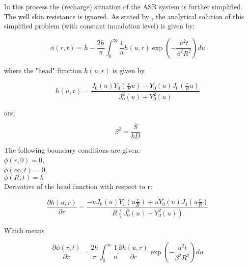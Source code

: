 In this process the (recharge) situation of the ASR system is further simplified. The well skin resistance is ignored. As stated by \citet{Bruggeman1999}, the analytical solution of this simplified problem (with constant inundation level) is given by: 

\begin{equation}
\phi (r, t) = h - \frac{2h}{\pi} \int_{0}^{\infty} \frac{1}{u} h(u, r) \exp ( -\frac{u^2 t}{\beta^2 R^2}) du
\label{eq:brug_22302}
\end{equation}

where the "head" function $h(u, r)$ is given by

\begin{equation}
h (u, r) = \frac{J_0(u) Y_0 (\frac{r}{R}u) - Y_0 (u) J_0 (\frac{r}{R}u)}{J_0^2(u) + Y_0^2(u)}
\label{eq:brug_22302headfunc}
\end{equation}

and 

\begin{equation}
\beta^2 = \frac{S}{kD}
\label{eq:brug_22302beta}
\end{equation}

The following boundary conditions are given: \\
$\phi(r, 0) = 0$, \\
$\phi (\infty, t) = 0$, \\
$\phi(R, t) = h$ \\

Derivative of the head function with respect to r:

\begin{equation}
\frac{ \partial h (u, r)}{\partial r} = \frac{- u J_0(u) Y_1(u \frac{r}{R}) + u Y_0(u) J_1(u \frac{r}{R})}{R (J_0^2(u) + Y_0^2(u))}
\label{eq:brug_22302deriv}
\end{equation}

Which means 

\begin{equation}
\frac{\partial \phi (r, t)}{\partial r} = \frac{2h}{\pi} \int_0^{\infty} \frac{1}{u} \frac{\partial h (u, r)}{\partial r} \exp( -\frac{u^2 t}{\beta^2 R^2}) du
\label{eq:brug_22302deriv}
\end{equation}


